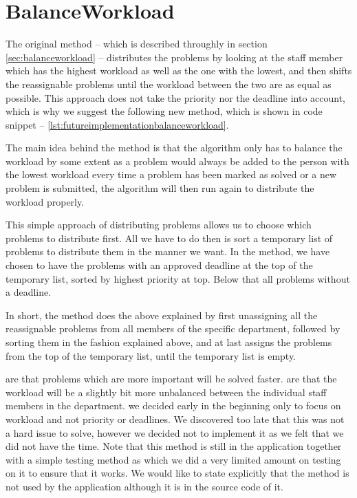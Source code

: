 \section{BalanceWorkload}
\label{sec:futureimplementationbalanceworkload}

The original  method -- which is described throughly in section \ref{sec:balanceworkload} -- distributes the problems by looking at the staff member which has the highest workload as well as the one with the lowest, and then shifts the reassignable problems until the workload between the two are as equal as possible. This approach does not take the priority nor the deadline into account, which is why we suggest the following new method, which is shown in code snippet -- \ref{lst:futureimplementationbalanceworkload}. 

The main idea behind the  method is that the algorithm only has to balance the workload by some extent as a problem would always be added to the person with the lowest workload every time a problem has been marked as solved or a new problem is submitted, the algorithm will then run again to distribute the workload properly.

This simple approach of distributing problems allows us to choose which problems to distribute first. All we have to do then is sort a temporary list of problems to distribute them in the manner we want. In the  method, we have chosen to have the problems with an approved deadline at the top of the temporary list, sorted by highest priority at top. Below that all problems without a deadline.

In short, the  method does the above explained by first unassigning all the reassignable problems from all members of the specific department, followed by sorting them in the fashion explained above, and at last assigns the problems from the top of the temporary list, until the temporary list is empty.

 are that problems which are more important will be solved faster.
 are that the workload will be a slightly bit more unbalanced between the individual staff members in the department.
 we decided early in the beginning only to focus on workload and not priority or deadlines. We discovered too late that this was not a hard issue to solve, however we decided not to implement it as we felt that we did not have the time. Note that this method is still in the application together with a simple testing method as which we did a very limited amount on testing on it to ensure that it works. We would like to state explicitly that the  method is not used by the application although it is in the source code of it.

